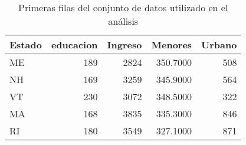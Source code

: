 \begin{table}[H]
    \centering
    \color{blue}
    \caption{Primeras filas del conjunto de datos utilizado en el análisis}
    \label{tab:head_datos}
    \begin{tabular}{lrrrr}
        \toprule
        Estado & educacion & Ingreso & Menores & Urbano \\
        \midrule
        ME & 189 & 2824 & 350.7000 & 508 \\
        NH & 169 & 3259 & 345.9000 & 564 \\
        VT & 230 & 3072 & 348.5000 & 322 \\
        MA & 168 & 3835 & 335.3000 & 846 \\
        RI & 180 & 3549 & 327.1000 & 871 \\
        \bottomrule
    \end{tabular}
\end{table}

